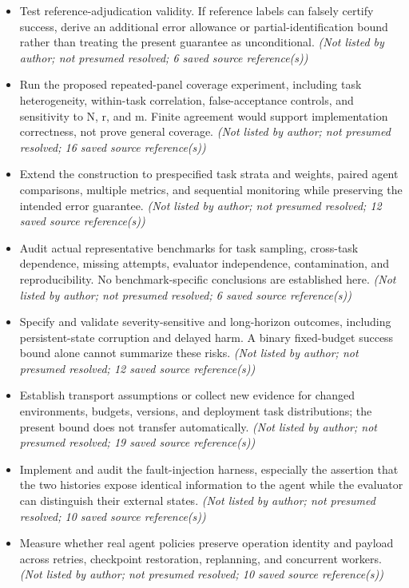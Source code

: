 \documentclass[11pt]{article}
\begin{document}
\begin{itemize}
\item Test reference-adjudication validity. If reference labels can falsely certify success, derive an additional error allowance or partial-identification bound rather than treating the present guarantee as unconditional. \textit{ (Not listed by author; not presumed resolved; 6 saved source reference(s))}
\item Run the proposed repeated-panel coverage experiment, including task heterogeneity, within-task correlation, false-acceptance controls, and sensitivity to N, r, and m. Finite agreement would support implementation correctness, not prove general coverage. \textit{ (Not listed by author; not presumed resolved; 16 saved source reference(s))}
\item Extend the construction to prespecified task strata and weights, paired agent comparisons, multiple metrics, and sequential monitoring while preserving the intended error guarantee. \textit{ (Not listed by author; not presumed resolved; 12 saved source reference(s))}
\item Audit actual representative benchmarks for task sampling, cross-task dependence, missing attempts, evaluator independence, contamination, and reproducibility. No benchmark-specific conclusions are established here. \textit{ (Not listed by author; not presumed resolved; 6 saved source reference(s))}
\item Specify and validate severity-sensitive and long-horizon outcomes, including persistent-state corruption and delayed harm. A binary fixed-budget success bound alone cannot summarize these risks. \textit{ (Not listed by author; not presumed resolved; 12 saved source reference(s))}
\item Establish transport assumptions or collect new evidence for changed environments, budgets, versions, and deployment task distributions; the present bound does not transfer automatically. \textit{ (Not listed by author; not presumed resolved; 19 saved source reference(s))}
\item Implement and audit the fault-injection harness, especially the assertion that the two histories expose identical information to the agent while the evaluator can distinguish their external states. \textit{ (Not listed by author; not presumed resolved; 10 saved source reference(s))}
\item Measure whether real agent policies preserve operation identity and payload across retries, checkpoint restoration, replanning, and concurrent workers. \textit{ (Not listed by author; not presumed resolved; 10 saved source reference(s))}

\end{itemize}
\end{document}
